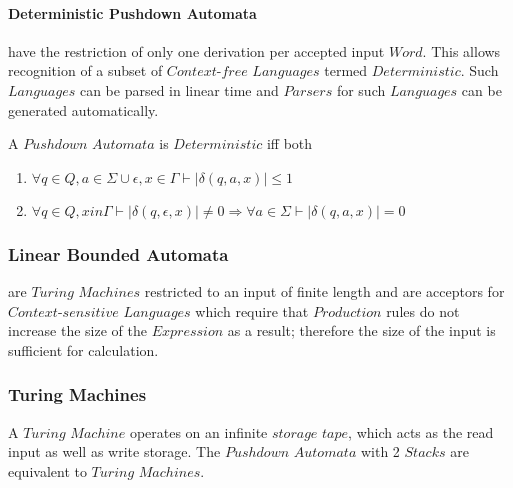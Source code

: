 \documentclass{article}
\begin{document}
    \paragraph{Deterministic Pushdown Automata} have the
    restriction of only one derivation per accepted input $Word$. This
    allows recognition of a subset of $Context$-$free$ $Languages$
    termed $Deterministic$. Such $Languages$ can be parsed in linear
    time and $Parsers$ for such $Languages$ can be generated
    automatically.

    A $Pushdown$ $Automata$ is $Deterministic$ iff both
    \begin{enumerate}
    \item $\forall q \in Q, a \in \Sigma \cup {\epsilon}, x \in
      \Gamma \vdash |\delta(q,a,x)| \leq 1$
    \item $\forall q \in Q, x in \Gamma \vdash |\delta(q,\epsilon,x)|
      \neq 0 \Rightarrow \forall a \in \Sigma \vdash |\delta(q,a,x)|=0$
    \end{enumerate}

    \subsubsection{Linear Bounded Automata} are $Turing$ $Machines$
    restricted to an input of finite length and are acceptors for
    $Context$-$sensitive$ $Languages$ which require that $Production$
    rules do not increase the size of the $Expression$ as a result;
    therefore the size of the input is sufficient for calculation.

    \subsubsection{Turing Machines}
    A $Turing$ $Machine$ operates on an infinite $storage$ $tape$,
    which acts as the read input as well as write storage. The
    $Pushdown$ $Automata$ with 2 $Stacks$ are equivalent to $Turing$
    $Machines$.
\end{document}
